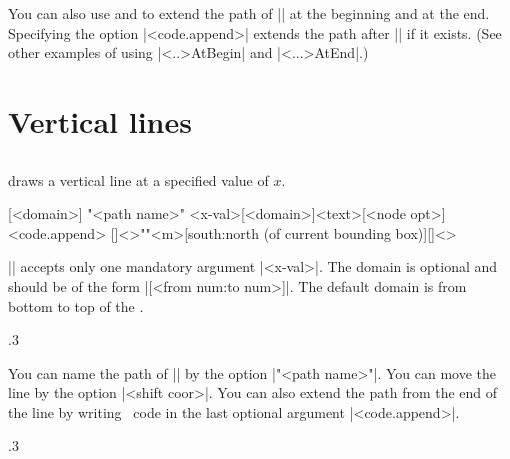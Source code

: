 You can also use \icmd{\tzhfnAtBegin} and \icmd{\tzhfnAtEnd} to extend the path of |\tzhfn| at the beginning and at the end. Specifying the option |<code.append>| extends the path after |\tzhfnAtEnd| if it exists.
(See other examples of using |\tz<..>AtBegin| and |\tz<...>AtEnd|.)


\section{Vertical lines}
\label{s:tzvfn}

\subsection{\protect\cmd{\tzvfnat}}
\label{ss:tzvfnat}

\icmd{\tzvfnat} draws a vertical line at a specified value of $x$.

\begin{tzdef}{}
[<domain>]
"<path name>"
        {<x-val>}[<domain>]{<text>}[<node opt>]<code.append>
  []<>""{<m>}[south:north (of current bounding box)]{}[]<>
\end{tzdef}

|\tzvfnat| accepts only one mandatory argument |{<x-val>}|.
The domain is optional and should be of the form |[<from num:to num>]|.
The default domain is from bottom to top of the .


\begin{tzcode}{.3}
{}
\end{tzcode}

You can name the path of |\tzvfnat| by the option |"<path name>"|.
You can move the line by the option |<shift coor>|.
You can also extend the path from the end of the line by writing \Tikz\ code in the last optional argument |<code.append>|.

\begin{tzcode}{.3}
\end{tzcode}

